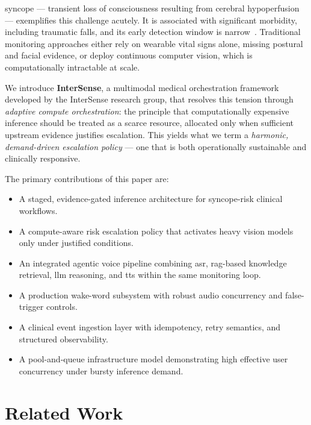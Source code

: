 \documentclass[10pt,twocolumn,a4paper]{article}
\begin{document}
\Gls{syncope} — transient loss of consciousness resulting from
cerebral hypoperfusion — exemplifies this challenge acutely.  It is
associated with significant morbidity, including traumatic falls, and
its early detection window is narrow~\cite{brignole2018esc}.
Traditional monitoring approaches either rely on wearable vital signs
alone, missing postural and facial evidence, or deploy continuous
computer vision, which is computationally intractable at scale.

We introduce \textbf{InterSense}, a multimodal medical orchestration
framework developed by the InterSense research group, that resolves
this tension through \emph{adaptive compute
orchestration}: the principle that computationally expensive inference
should be treated as a scarce resource, allocated only when sufficient
upstream evidence justifies escalation.  This yields what we term a
\emph{harmonic, demand-driven escalation policy} — one that is both
operationally sustainable and clinically responsive.

The primary contributions of this paper are:
\begin{itemize}
  \item A staged, evidence-gated inference architecture for
        \gls{syncope}-risk clinical workflows.
  \item A compute-aware risk escalation policy that activates heavy
        vision models only under justified conditions.
  \item An integrated agentic voice pipeline combining \gls{asr},
        \gls{rag}-based knowledge retrieval, \gls{llm} reasoning, and
        \gls{tts} within the same monitoring loop.
  \item A production wake-word subsystem with robust audio concurrency
        and false-trigger controls.
  \item A clinical event ingestion layer with idempotency, retry
        semantics, and structured observability.
  \item A pool-and-queue infrastructure model demonstrating high
        effective user concurrency under bursty inference demand.
\end{itemize}

\section{Related Work}
\end{document}
